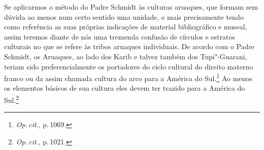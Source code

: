 Se aplicarmos o método do Padre Schmidt às culturas aruaques, que formam
sem dúvida ao menos num certo sentido uma unidade, e mais precisamente
tendo como referência as suas próprias indicações de material
bibliográfico e museal, assim teremos diante de nós uma tremenda
confusão de círculos e estratos culturais no que se refere às tribos
aruaques individuais. De acordo com o Padre Schmidt, os Aruaques, ao lado
dos Karib e talvez também dos Tupi"-Guarani, teriam sido
preferencialmente os portadores do ciclo cultural do direito materno
franco ou da assim
chamada cultura do arco para a América do Sul.\footnote{\textit{Op.\,cit}., p.\,1069.} Ao menos os elementos básicos de sua cultura eles devem ter
trazido para a América do Sul.\footnote{\textit{Op.\,cit}., p.\,1021.}


